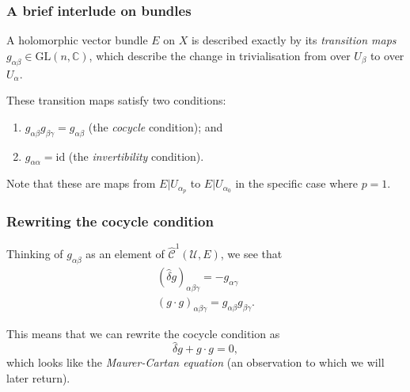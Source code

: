 \documentclass{beamer}
\begin{document}
        \begin{frame}\frametitle{A brief interlude on bundles}
            A holomorphic vector bundle $E$ on $X$ is described exactly by its \emph{transition maps $g_{\alpha\beta}\in\mathrm{GL}(n,\mathbb{C})$}, which describe the change in trivialisation from over $U_\beta$ to over $U_\alpha$.

            \pause

            These transition maps satisfy two conditions:

            \pause
            
            \begin{enumerate}
                \item $g_{\alpha\beta}g_{\beta\gamma}=g_{\alpha\beta}$ (the \emph{cocycle} condition); and
                \pause
                \item $g_{\alpha\alpha}=\mathrm{id}$ (the \emph{invertibility} condition).
            \end{enumerate}

            \pause

            Note that these are maps from $E|U_{\alpha_p}$ to $E|U_{\alpha_0}$ in the specific case where $p=1$.
        \end{frame}

        \begin{frame}\frametitle{Rewriting the cocycle condition}
            Thinking of $g_{\alpha\beta}$ as an element of $\hat{\mathscr{C}}^1(\mathcal{U},E)$, we see that
            \begin{gather*}
                (\hat{\delta}g)_{\alpha\beta\gamma} = -g_{\alpha\gamma}\\
                (g\cdot g)_{\alpha\beta\gamma} = g_{\alpha\beta}g_{\beta\gamma}.
            \end{gather*}

            \pause

            This means that we can rewrite the cocycle condition as
            \begin{equation*}
                \hat{\delta}g + g\cdot g = 0,
            \end{equation*}
            which looks like the \emph{Maurer-Cartan equation} (an observation to which we will later return).
        \end{frame}
\end{document}
